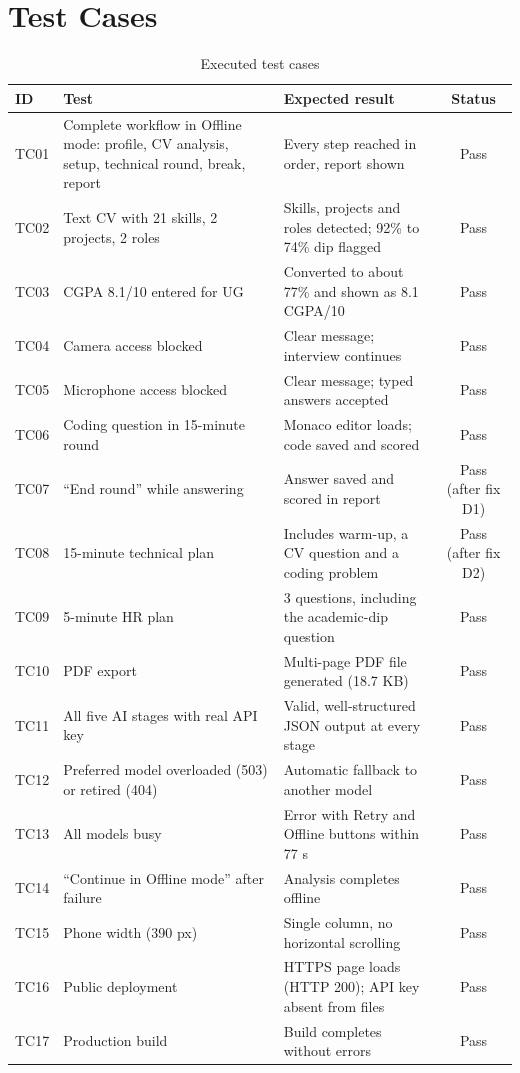 \documentclass[12pt,a4paper,oneside]{report}
\begin{document}
\section{Test Cases}
\begin{table}[H]
\centering
\caption{Executed test cases}
\label{tab:tests}
\footnotesize
\begin{tabularx}{\textwidth}{@{}lYYc@{}}
\toprule
\textbf{ID} & \textbf{Test} & \textbf{Expected result} & \textbf{Status} \\
\midrule
TC01 & Complete workflow in Offline mode: profile, CV analysis, setup, technical round, break, report & Every step reached in order, report shown & Pass \\
TC02 & Text CV with 21 skills, 2 projects, 2 roles & Skills, projects and roles detected; 92\% to 74\% dip flagged & Pass \\
TC03 & CGPA 8.1/10 entered for UG & Converted to about 77\% and shown as 8.1 CGPA/10 & Pass \\
TC04 & Camera access blocked & Clear message; interview continues & Pass \\
TC05 & Microphone access blocked & Clear message; typed answers accepted & Pass \\
TC06 & Coding question in 15-minute round & Monaco editor loads; code saved and scored & Pass \\
TC07 & ``End round'' while answering & Answer saved and scored in report & Pass (after fix D1) \\
TC08 & 15-minute technical plan & Includes warm-up, a CV question and a coding problem & Pass (after fix D2) \\
TC09 & 5-minute HR plan & 3 questions, including the academic-dip question & Pass \\
TC10 & PDF export & Multi-page PDF file generated (18.7 KB) & Pass \\
TC11 & All five AI stages with real API key & Valid, well-structured JSON output at every stage & Pass \\
TC12 & Preferred model overloaded (503) or retired (404) & Automatic fallback to another model & Pass \\
TC13 & All models busy & Error with Retry and Offline buttons within 77 s & Pass \\
TC14 & ``Continue in Offline mode'' after failure & Analysis completes offline & Pass \\
TC15 & Phone width (390 px) & Single column, no horizontal scrolling & Pass \\
TC16 & Public deployment & HTTPS page loads (HTTP 200); API key absent from files & Pass \\
TC17 & Production build & Build completes without errors & Pass \\
\bottomrule
\end{tabularx}
\end{table}
\end{document}
